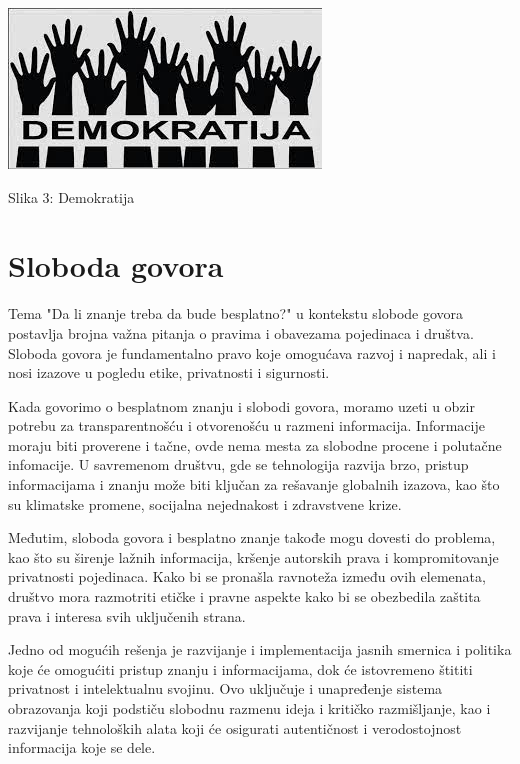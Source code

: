 \documentclass[a4paper]{article}
\begin{document}
{\begin{center}
\includegraphics[scale=0.85]{demokratija.jpeg}
\end{center}
\caption{Slika 3: Demokratija}
\label{demokratija}


\setlength{\parskip}{1em}



\section{Sloboda govora}
\label{Sloboda govora}

Tema "Da li znanje treba da bude besplatno?" u kontekstu slobode govora postavlja brojna važna pitanja o pravima i obavezama pojedinaca i društva. Sloboda govora je fundamentalno pravo koje omogućava razvoj i napredak, ali i nosi izazove u pogledu etike, privatnosti i sigurnosti.

Kada govorimo o besplatnom znanju i slobodi govora, moramo uzeti u obzir potrebu za transparentnošću i otvorenošću u razmeni informacija. Informacije moraju biti proverene i tačne, ovde nema mesta za slobodne procene i polutačne infomacije. U savremenom društvu, gde se tehnologija razvija brzo, pristup informacijama i znanju može biti ključan za rešavanje globalnih izazova, kao što su klimatske promene, socijalna nejednakost i zdravstvene krize.

Međutim, sloboda govora i besplatno znanje takođe mogu dovesti do problema, kao što su širenje lažnih informacija, kršenje autorskih prava i kompromitovanje privatnosti pojedinaca. Kako bi se pronašla ravnoteža između ovih elemenata, društvo mora razmotriti etičke i pravne aspekte kako bi se obezbedila zaštita prava i interesa svih uključenih strana.

Jedno od mogućih rešenja je razvijanje i implementacija jasnih smernica i politika koje će omogućiti pristup znanju i informacijama, dok će istovremeno štititi privatnost i intelektualnu svojinu. Ovo uključuje i unapređenje sistema obrazovanja koji podstiču slobodnu razmenu ideja i kritičko razmišljanje, kao i razvijanje tehnoloških alata koji će osigurati autentičnost i verodostojnost informacija koje se dele.

}
\end{document}

